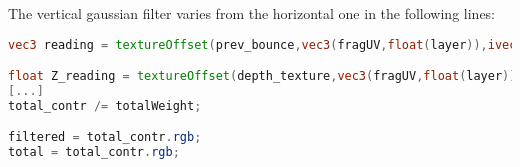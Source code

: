 The vertical gaussian filter varies from the horizontal one in the following lines:
\begin{lstlisting}[caption={bilat\_vert\_wblend.frag},language=GLSL]
vec3 reading = textureOffset(prev_bounce,vec3(fragUV,float(layer)),ivec2(0,i)).rgb;

float Z_reading = textureOffset(depth_texture,vec3(fragUV,float(layer)),ivec2(0,i)).r;
[...]
total_contr /= totalWeight;

filtered = total_contr.rgb;
total = total_contr.rgb;
\end{lstlisting}